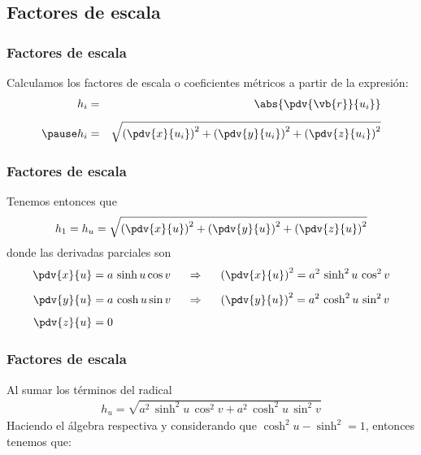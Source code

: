 \subsection{Factores de escala}
\begin{frame}
\frametitle{Factores de escala}
Calculamos los factores de escala o coeficientes métricos a partir de la expresión:
\begin{eqnarray*}
h_{i} &=& \abs{\pdv{\vb{r}}{u_{i}}} \\[0.5em]
\pause
h_{i} &=& \sqrt{ \left( \pdv{x}{u_{i}} \right)^{2} + \left( \pdv{y}{u_{i}} \right)^{2} + \left( \pdv{z}{u_{i}} \right)^{2}}
\end{eqnarray*}
\end{frame}
\begin{frame}
\frametitle{Factores de escala}
Tenemos entonces que
\begin{align*}
h_{1} = h_{u} = \sqrt{ \left( \pdv{x}{u} \right)^{2} + \left( \pdv{y}{u} \right)^{2} + \left( \pdv{z}{u} \right)^{2}}
\end{align*}
\pause
donde las derivadas parciales son
\fontsize{12}{12}\selectfont
\begin{align*}
\pdv{x}{u} &= a \, \sinh u \cos v \hspace{0.5cm} \Rightarrow \hspace{0.5cm} \left( \pdv{x}{u} \right)^{2} = a^{2} \, \sinh^{2} u \, \cos^{2} v \\[0.5em]
\pdv{y}{u} &= a \, \cosh u \sin v \hspace{0.5cm} \Rightarrow \hspace{0.5cm} \left( \pdv{y}{u} \right)^{2} = a^{2} \, \cosh^{2} u \, \sin^{2} v \\[0.5em]
\pdv{z}{u} &= 0
\end{align*}
\end{frame}
\begin{frame}
\frametitle{Factores de escala}
Al sumar los términos del radical
\begin{align*}
h_{u} = \sqrt{a^{2} \, \sinh^{2} u \, \cos^{2} v + a^{2} \, \cosh^{2} u \, \sin^{2} v}
\end{align*}
Haciendo el álgebra respectiva y considerando que $\cosh^{2} u - \sinh^{2} = 1$, entonces tenemos que:
\end{frame}
